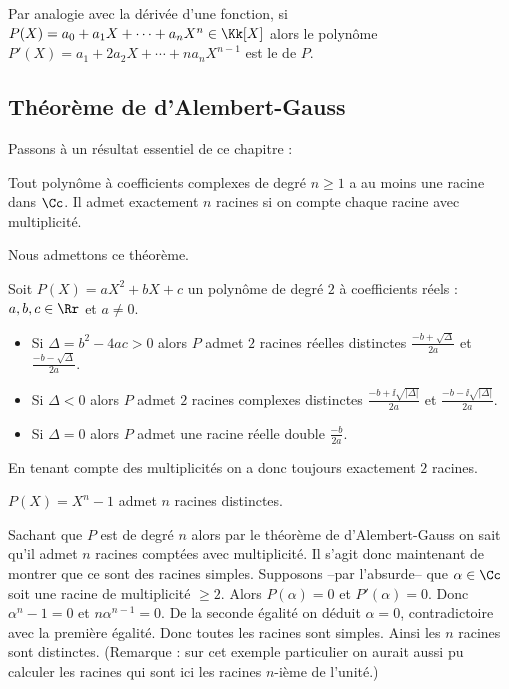 \documentclass[class=report,crop=false]{standalone}
\begin{document}
\begin{remarque*}
Par analogie avec la dérivée d'une fonction,
si $P(X) = a_0+a_1X+\cdots+a_nX^n\in\Kk[X]$ alors le polynôme
$P'(X) = a_1+2a_2X+\cdots+na_nX^{n-1}$ est le 
de $P$.
\end{remarque*}

\subsection{Théorème de d'Alembert-Gauss}

Passons à un résultat essentiel de ce chapitre :

\begin{theoreme}
Tout polynôme à coefficients complexes de degré $n \ge 1$
a au moins une racine dans $\Cc$.
Il admet exactement $n$ racines si on compte chaque racine
avec multiplicité.
\end{theoreme}

Nous admettons ce théorème.

\begin{exemple}
Soit $P(X)=aX^2+bX+c$ un polynôme de degré $2$ à coefficients réels : $a,b,c \in \Rr$ et $a\neq 0$.
\begin{itemize}
  \item Si $\Delta = b^2-4ac > 0$ alors $P$ admet $2$ racines réelles distinctes $\frac{-b+\sqrt{\Delta}}{2a}$
et $\frac{-b-\sqrt{\Delta}}{2a}$.
  \item Si $\Delta < 0$ alors $P$ admet $2$ racines complexes distinctes $\frac{-b+\ii\sqrt{|\Delta|}}{2a}$
et $\frac{-b-\ii\sqrt{|\Delta|}}{2a}$.
  \item Si $\Delta = 0$ alors $P$ admet une racine réelle double $\frac{-b}{2a}$.
\end{itemize}
En tenant compte des multiplicités on a donc toujours exactement $2$ racines.
\end{exemple}

\begin{exemple}
$P(X)=X^n-1$ admet $n$ racines distinctes.

Sachant que $P$ est de degré $n$ alors par le théorème de d'Alembert-Gauss
on sait qu'il admet $n$ racines comptées avec multiplicité.
Il s'agit donc maintenant de montrer que ce sont des racines simples.
Supposons --par l'absurde-- que $\alpha \in \Cc$ soit une racine de multiplicité $\ge 2$.
Alors $P(\alpha)=0$ et $P'(\alpha)=0$.
Donc $\alpha^n-1=0$ et $n\alpha^{n-1}=0$. De la seconde égalité on déduit $\alpha=0$,
contradictoire avec la première égalité. Donc toutes les racines sont simples.
Ainsi les $n$ racines sont distinctes.
(Remarque : sur cet exemple particulier on aurait aussi pu calculer les racines
qui sont ici les racines $n$-ième de l'unité.)
\end{exemple}
\end{document}
